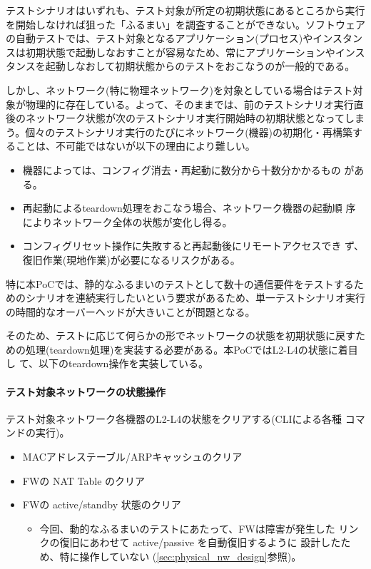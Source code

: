 テストシナリオはいずれも、テスト対象が所定の初期状態にあるところから実行
を開始しなければ狙った「ふるまい」を調査することができない。ソフトウェア
の自動テストでは、テスト対象となるアプリケーション(プロセス)やインスタン
スは初期状態で起動しなおすことが容易なため、常にアプリケーションやインス
タンスを起動しなおして初期状態からのテストをおこなうのが一般的である。

しかし、ネットワーク(特に物理ネットワーク)を対象としている場合はテスト対
象が物理的に存在している。よって、そのままでは、前のテストシナリオ実行直
後のネットワーク状態が次のテストシナリオ実行開始時の初期状態となってしま
う。個々のテストシナリオ実行のたびにネットワーク(機器)の初期化・再構築す
ることは、不可能ではないが以下の理由により難しい。
\begin{itemize}
 \item 機器によっては、コンフィグ消去・再起動に数分から十数分かかるもの
       がある。
 \item 再起動によるteardown処理をおこなう場合、ネットワーク機器の起動順
       序によりネットワーク全体の状態が変化し得る。
 \item コンフィグリセット操作に失敗すると再起動後にリモートアクセスでき
       ず、復旧作業(現地作業)が必要になるリスクがある。
\end{itemize}
特に本PoCでは、静的なふるまいのテストとして数十の通信要件をテストするた
めのシナリオを連続実行したいという要求があるため、単一テストシナリオ実行
の時間的なオーバーヘッドが大きいことが問題となる。

そのため、テストに応じて何らかの形でネットワークの状態を初期状態に戻すた
めの処理(teardown処理)を実装する必要がある。本PoCではL2-L4の状態に着目し
て、以下のteardown操作を実装している。

    \paragraph{テスト対象ネットワークの状態操作}
テスト対象ネットワーク各機器のL2-L4の状態をクリアする(CLIによる各種
コマンドの実行)。
\begin{itemize}
 \item MACアドレステーブル/ARPキャッシュのクリア
 \item FWの NAT Table のクリア
 \item FWの active/standby 状態のクリア
       \begin{itemize}
        \item 今回、動的なふるまいのテストにあたって、FWは障害が発生した
              リンクの復旧にあわせて active/passive を自動復旧するように
              設計したため、特に操作していない
              (\ref{sec:physical_nw_design}参照)。
       \end{itemize}
\end{itemize}

